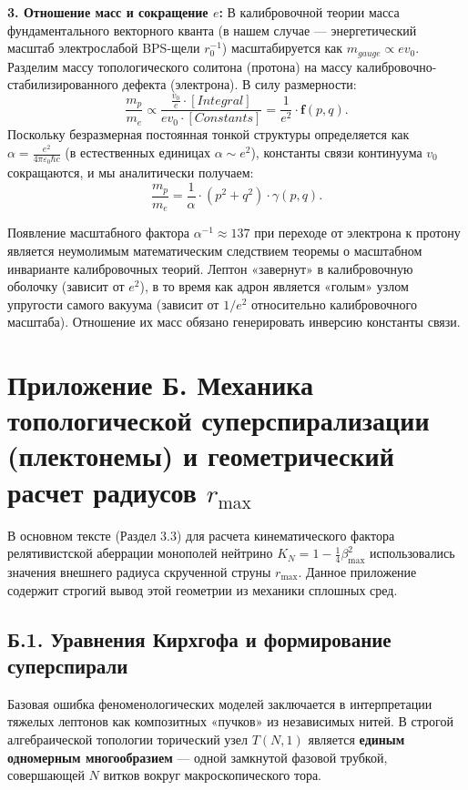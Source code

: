 \documentclass[11pt,a4paper]{article}
\begin{document}
	\textbf{3. Отношение масс и сокращение $e$:}
	В калибровочной теории масса фундаментального векторного кванта (в нашем случае — энергетический масштаб электрослабой BPS-щели $r_0^{-1}$) масштабируется как $m_{gauge} \propto e v_0$.
	Разделим массу топологического солитона (протона) на массу калибровочно-стабилизированного дефекта (электрона). В силу размерности:
	\begin{equation}
		\frac{m_p}{m_e} \propto \frac{\frac{v_0}{e} \cdot [Integral]}{e v_0 \cdot [Constants]} = \frac{1}{e^2} \cdot \mathbf{f}(p,q).
	\end{equation}
	Поскольку безразмерная постоянная тонкой структуры определяется как $\alpha = \frac{e^2}{4\pi\varepsilon_0 \hbar c}$ (в естественных единицах $\alpha \sim e^2$), константы связи континуума $v_0$ сокращаются, и мы аналитически получаем:
	\begin{equation}
		\frac{m_p}{m_e} = \frac{1}{\alpha} \cdot (p^2+q^2) \cdot \gamma(p,q).
	\end{equation}
	
	Появление масштабного фактора $\alpha^{-1} \approx 137$ при переходе от электрона к протону является неумолимым математическим следствием теоремы о масштабном инварианте калибровочных теорий. Лептон «завернут» в калибровочную оболочку (зависит от $e^2$), в то время как адрон является «голым» узлом упругости самого вакуума (зависит от $1/e^2$ относительно калибровочного масштаба). Отношение их масс обязано генерировать инверсию константы связи.
	
	\section*{Приложение Б. Механика топологической суперспирализации (плектонемы) и геометрический расчет радиусов $r_{\text{max}}$}
	
	В основном тексте (Раздел 3.3) для расчета кинематического фактора релятивистской аберрации монополей нейтрино $K_N = 1 - \frac{1}{4}\beta_{\text{max}}^2$ использовались значения внешнего радиуса скрученной струны $r_{\text{max}}$. Данное приложение содержит строгий вывод этой геометрии из механики сплошных сред.
	
	\subsection*{Б.1. Уравнения Кирхгофа и формирование суперспирали}
	Базовая ошибка феноменологических моделей заключается в интерпретации тяжелых лептонов как композитных «пучков» из независимых нитей. В строгой алгебраической топологии торический узел $T(N,1)$ является \textbf{единым одномерным многообразием} — одной замкнутой фазовой трубкой, совершающей $N$ витков вокруг макроскопического тора.
	
\end{document}
